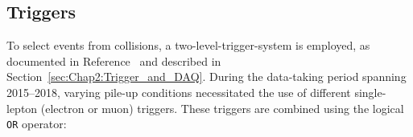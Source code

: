 %
%
\subsection{Triggers}
\label{sec:ChaptH:ObjectDefReco:trigger}
To select events from collisions, a two-level-trigger-system is employed, as documented in Reference~\cite{TRIG-2016-01} and 
described in Section~\ref{sec:Chap2:Trigger_and_DAQ}. 
During the data-taking period spanning 2015--2018, varying pile-up conditions necessitated the use of different single-lepton 
(electron or muon) triggers. %
These triggers are combined using the logical \texttt{OR} operator:

